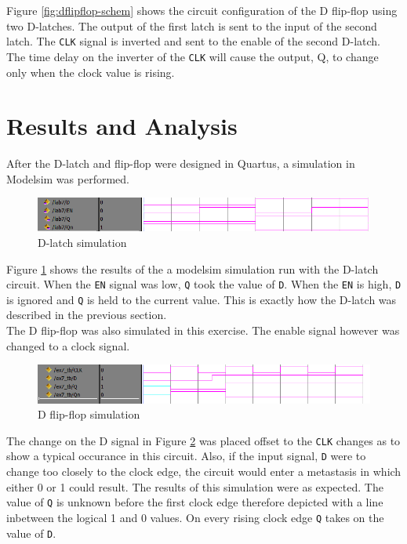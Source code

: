 \documentclass[CMPE]{KGCOEReport}
\begin{document}
Figure \ref{fig:dflipflop-schem} shows the circuit configuration of the D flip-flop using two D-latches. The output of the first latch is sent to the input of the second latch. The \texttt{CLK} signal is inverted and sent to the enable of the second D-latch. The time delay on the inverter of the \texttt{CLK} will cause the output, Q, to change only when the clock value is rising.

\section*{Results and Analysis}

After the D-latch and flip-flop were designed in Quartus, a simulation in Modelsim was performed.

\begin{figure}[h!]
	\centering
	\includegraphics[width=\textwidth]{part1}
	\caption{D-latch simulation}
	\label{fig:dlatch-sim}
\end{figure}

Figure \ref{fig:dlatch-sim} shows the results of the a modelsim simulation run with the D-latch circuit. When the \texttt{EN} signal was low, \texttt{Q} took the value of \texttt{D}. When the \texttt{EN} is high, \texttt{D} is ignored and \texttt{Q} is held to the current value. This is exactly how the D-latch was described in the previous section.\\

The D flip-flop was also simulated in this exercise. The enable signal however was changed to a clock signal.\pagebreak

\begin{figure}[h!]
	\centering
	\includegraphics[width=\textwidth]{part2}
	\caption{D flip-flop simulation}
	\label{fig:dflipflop-sim}
\end{figure}

The change on the D signal in Figure \ref{fig:dflipflop-sim} was placed offset to the \texttt{CLK} changes as to show a typical occurance in this circuit. Also, if the input signal, \texttt{D} were to change too closely to the clock edge, the circuit would enter a metastasis in which either 0 or 1 could result. The results of this simulation were as expected. The value of \texttt{Q} is unknown before the first clock edge therefore depicted with a line inbetween the logical 1 and 0 values. On every rising clock edge \texttt{Q} takes on the value of \texttt{D}.\\
\end{document}
